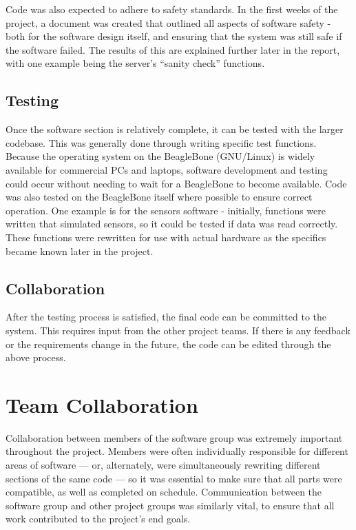 Code was also expected to adhere to safety standards. In the first weeks of the project, a document\cite{kruger_safety} was created that outlined all aspects of software safety - both for the software design itself, and ensuring that the system was still safe if the software failed. The results of this are explained further later in the report, with one example being the server's ``sanity check'' functions.

\subsection{Testing}

Once the software section is relatively complete, it can be tested with the larger codebase. This was generally done through writing specific test functions. Because the operating system on the BeagleBone (GNU/Linux) is widely available for commercial PCs and laptops, software development and testing could occur without needing to wait for a BeagleBone to become available. Code was also tested on the BeagleBone itself where possible to ensure correct operation. One example is for the sensors software - initially, functions were written that simulated sensors, so it could be tested if data was read correctly. These functions were rewritten for use with actual hardware as the specifics became known later in the project.

\subsection{Collaboration}
After the testing process is satisfied, the final code can be committed to the system. This requires input from the other project teams. If there is any feedback or the requirements change in the future, the code can be edited through the above process.

\section{Team Collaboration}

Collaboration between members of the software group was extremely important throughout the project. Members were often individually responsible for different areas of software --- or, alternately, were simultaneously rewriting different sections of the same code --- so it was essential to make sure that all parts were compatible, as well as completed on schedule. Communication between the software group and other project groups was similarly vital, to ensure that all work contributed to the project's end goals. 

